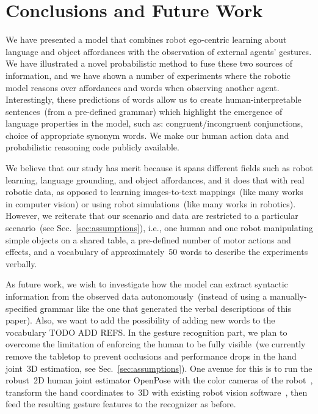 
\section{Conclusions and Future Work}
\label{sec:conclusions}

We have presented a model that combines robot ego-centric learning about language and object affordances with the observation of external agents' gestures.
We have illustrated a novel probabilistic method to fuse these two sources of information, and we have shown a number of experiments where the robotic model reasons over affordances and words when observing another agent.
Interestingly, these predictions of words allow us to create human-interpretable sentences~(from a pre-defined grammar) which highlight the emergence of language properties in the model, such as:
congruent/incongruent conjunctions,
choice of appropriate synonym words. %
We make our human action data and probabilistic reasoning code publicly available.

We believe that our study has merit because it spans different fields such as robot learning, language grounding, and object affordances, and it does that with real robotic data, as opposed to learning images-to-text mappings~(like many works in computer vision) or using robot simulations~(like many works in robotics).
However, we reiterate that our scenario and data are restricted to a particular scenario~(see Sec.~\ref{sec:assumptions}), i.e., one human and one robot manipulating simple objects on a shared table, a pre-defined number of motor actions and effects, and a vocabulary of approximately~$50$ words to describe the experiments verbally.

As future work, we wish to investigate how the model can extract syntactic information from the observed data autonomously~(instead of using a manually-specified grammar like the one that generated the verbal descriptions of this paper).
Also, we want to add the possibility of adding new words to the vocabulary TODO ADD REFS.
In the gesture recognition part, we plan to overcome the limitation of enforcing the human to be fully visible~(we currently remove the tabletop to prevent occlusions and performance drops in the hand joint~3D estimation, see Sec.~\ref{sec:assumptions}).
One avenue for this is to run the robust~2D human joint estimator OpenPose with the color cameras of the robot~\cite{cao:2017:openpose-cpvr}, transform the hand coordinates to~3D with existing robot vision software~\cite{roncone:2016:rss}, then feed the resulting gesture features to the recognizer as before.

